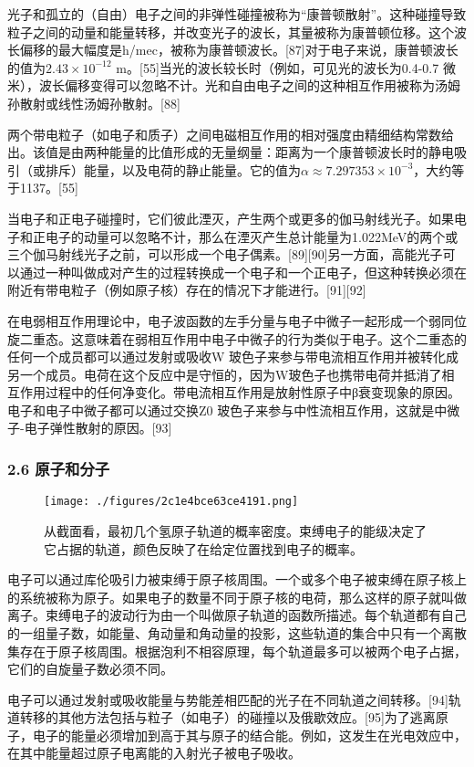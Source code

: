 光子和孤立的（自由）电子之间的非弹性碰撞被称为“康普顿散射”。这种碰撞导致粒子之间的动量和能量转移，并改变光子的波长，其量被称为康普顿位移。这个波长偏移的最大幅度是h/mec，被称为康普顿波长。[87]对于电子来说，康普顿波长的值为$2.43\times10^{-12}$ m。[55]当光的波长较长时（例如，可见光的波长为0.4-0.7 微米），波长偏移变得可以忽略不计。光和自由电子之间的这种相互作用被称为汤姆孙散射或线性汤姆孙散射。[88]

两个带电粒子（如电子和质子）之间电磁相互作用的相对强度由精细结构常数给出。该值是由两种能量的比值形成的无量纲量：距离为一个康普顿波长时的静电吸引（或排斥）能量，以及电荷的静止能量。它的值为$\alpha \approx 7.297353\times10^{-3}$，大约等于1137。[55]

当电子和正电子碰撞时，它们彼此湮灭，产生两个或更多的伽马射线光子。如果电子和正电子的动量可以忽略不计，那么在湮灭产生总计能量为1.022MeV的两个或三个伽马射线光子之前，可以形成一个电子偶素。[89][90]另一方面，高能光子可以通过一种叫做成对产生的过程转换成一个电子和一个正电子，但这种转换必须在附近有带电粒子（例如原子核）存在的情况下才能进行。[91][92]

在电弱相互作用理论中，电子波函数的左手分量与电子中微子一起形成一个弱同位旋二重态。这意味着在弱相互作用中电子中微子的行为类似于电子。这个二重态的任何一个成员都可以通过发射或吸收W 玻色子来参与带电流相互作用并被转化成另一个成员。电荷在这个反应中是守恒的，因为W玻色子也携带电荷并抵消了相互作用过程中的任何净变化。带电流相互作用是放射性原子中β衰变现象的原因。电子和电子中微子都可以通过交换Z0 玻色子来参与中性流相互作用，这就是中微子-电子弹性散射的原因。[93]
\subsubsection{2.6 原子和分子}
\begin{figure}[ht]
\centering
\texttt{[image: ./figures/2c1e4bce63ce4191.png]}
\caption{从截面看，最初几个氢原子轨道的概率密度。束缚电子的能级决定了它占据的轨道，颜色反映了在给定位置找到电子的概率。} \label{fig_DZ_10}
\end{figure}
电子可以通过库伦吸引力被束缚于原子核周围。一个或多个电子被束缚在原子核上的系统被称为原子。如果电子的数量不同于原子核的电荷，那么这样的原子就叫做离子。束缚电子的波动行为由一个叫做原子轨道的函数所描述。每个轨道都有自己的一组量子数，如能量、角动量和角动量的投影，这些轨道的集合中只有一个离散集存在于原子核周围。根据泡利不相容原理，每个轨道最多可以被两个电子占据，它们的自旋量子数必须不同。

电子可以通过发射或吸收能量与势能差相匹配的光子在不同轨道之间转移。[94]轨道转移的其他方法包括与粒子（如电子）的碰撞以及俄歇效应。[95]为了逃离原子，电子的能量必须增加到高于其与原子的结合能。例如，这发生在光电效应中，在其中能量超过原子电离能的入射光子被电子吸收。

